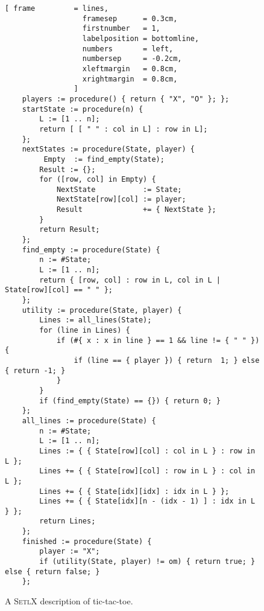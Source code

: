\begin{figure}[!ht]
\centering
\begin{Verbatim}[ frame         = lines, 
                  framesep      = 0.3cm, 
                  firstnumber   = 1,
                  labelposition = bottomline,
                  numbers       = left,
                  numbersep     = -0.2cm,
                  xleftmargin   = 0.8cm,
                  xrightmargin  = 0.8cm,
                ]
    players := procedure() { return { "X", "O" }; };
    startState := procedure(n) {
        L := [1 .. n];
        return [ [ " " : col in L] : row in L];
    };
    nextStates := procedure(State, player) {
         Empty  := find_empty(State);
        Result := {};
        for ([row, col] in Empty) {
            NextState           := State;
            NextState[row][col] := player;
            Result              += { NextState };
        }
        return Result;
    };
    find_empty := procedure(State) {
        n := #State;
        L := [1 .. n];
        return { [row, col] : row in L, col in L | State[row][col] == " " };
    };
    utility := procedure(State, player) {
        Lines := all_lines(State);
        for (line in Lines) {
            if (#{ x : x in line } == 1 && line != { " " }) {
                if (line == { player }) { return  1; } else { return -1; }
            }
        }
        if (find_empty(State) == {}) { return 0; }
    };
    all_lines := procedure(State) {
        n := #State;
        L := [1 .. n];
        Lines := { { State[row][col] : col in L } : row in L };
        Lines += { { State[row][col] : row in L } : col in L };
        Lines += { { State[idx][idx] : idx in L } };
        Lines += { { State[idx][n - (idx - 1) ] : idx in L } };
        return Lines;
    };
    finished := procedure(State) {
        player := "X";
        if (utility(State, player) != om) { return true; } else { return false; }
    };
\end{Verbatim}
\vspace*{-0.3cm}
\caption{A \textsc{SetlX} description of tic-tac-toe.}
\label{fig:ttt.stlx}
\end{figure}
 
